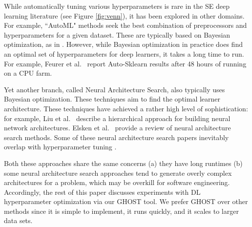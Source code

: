 \documentclass[10pt,compsoc,twocolumn]{IEEEtran}
\begin{document}
 
While automatically tuning various hyperparameters is rare in the SE deep learning literature (see  Figure \ref{fig:venn}),  it has been explored in other domains.
For example,   ``AutoML" methods seek the best combination of preprocessors and hyperparameters for a given dataset. These are typically based on Bayesian optimization, as in \cite{feurer2015efficient,thornton2013auto}. However, while Bayesian optimization in practice does find an optimal set of hyperparameters for deep learners, it takes a long time to run. For example, Feurer et al.~\cite{feurer2015efficient} report Auto-Sklearn results after 48 hours of running on a CPU farm.

Yet another branch, called Neural Architecture Search, also typically uses Bayesian optimization. These techniques aim to find the optimal learner architecture. These techniques have achieved a rather high level of sophistication: for example, Liu et al.~\cite{liu2019auto} describe a hierarchical approach for building neural network architectures. Elsken et al.~\cite{elsken2018neural} provide a review of neural architecture search methods. Some of these neural architecture search papers inevitably overlap with hyperparameter tuning \cite{bergstra2013making,domhan2015speeding,saxena2016convolutional,shahriari2015taking,stanley2002evolving}. 

Both these approaches share the same  concerns (a) they have long runtimes (b) some neural architecture search approaches tend to generate overly complex architectures for a problem, which may be overkill for software engineering. 
Accordingly, the rest of this paper discusses experiments with  DL hyperparameter optimization via our GHOST tool. We prefer GHOST  over
other methods since it is simple to implement, it runs quickly, and it scales to larger data sets. 

 


  
\end{document}
